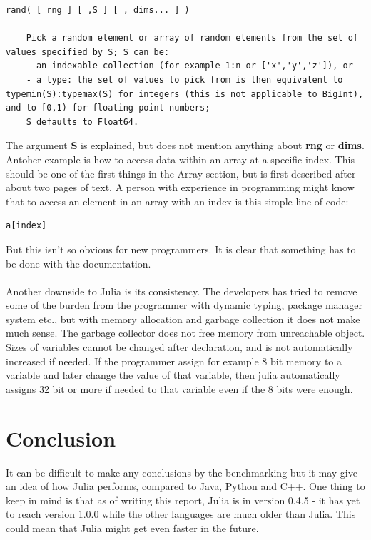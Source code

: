 \documentclass[a4paper,11pt]{article}
\begin{document}
\begin{lstlisting}
rand( [ rng ] [ ,S ] [ , dims... ] )

	Pick a random element or array of random elements from the set of values specified by S; S can be:
	- an indexable collection (for example 1:n or ['x','y','z']), or  
	- a type: the set of values to pick from is then equivalent to typemin(S):typemax(S) for integers (this is not applicable to BigInt), and to [0,1) for floating point numbers;  
	S defaults to Float64.
\end{lstlisting} 
The argument \textbf{S} is explained, but does not mention anything about \textbf{rng} or \textbf{dims}.\\
Antoher example is how to access data within an array at a specific index. This should be one of the first things in the Array section, but is first described after about two pages of text. A person with experience in programming might know that to access an element in an array with an index is this simple line of code:
\begin{lstlisting}
a[index]
\end{lstlisting} 
But this isn’t so obvious for new programmers. It is clear that something has to be done with the documentation.\\
\\ 
Another downside to Julia is its consistency. The developers has tried to remove some of the burden from the programmer with dynamic typing, package manager system etc., but with memory allocation and garbage collection it does not make much sense. The garbage collector does not free memory from unreachable object. Sizes of variables cannot be changed after declaration, and is not automatically increased if needed. If the programmer assign for example 8 bit memory to a variable and later change the value of that variable, then julia automatically assigns 32 bit or more if needed to that variable even if the 8 bits were enough. 

\section{Conclusion}
It can be difficult to make any conclusions by the benchmarking but it may give an idea of how Julia performs, compared to Java, Python and C++. One thing to keep in mind is that as of writing this report, Julia is in version 0.4.5 - it has yet to reach version 1.0.0 while the other languages are much older than Julia. This could mean that Julia might get even faster in the future.   
\end{document}
